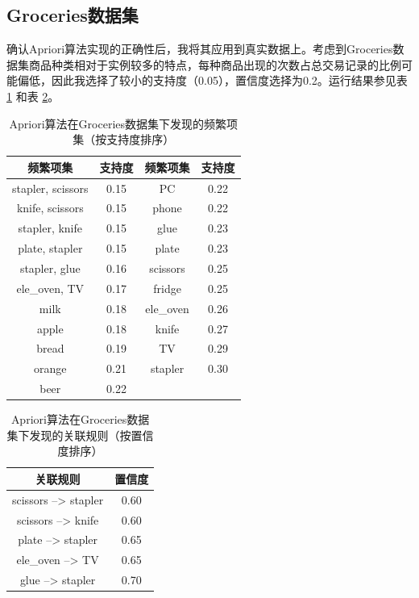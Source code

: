 \documentclass[12pt,a4paper]{article}
\theoremstyle{definition}
\begin{document}
\subsection{Groceries数据集}

确认Apriori算法实现的正确性后，我将其应用到真实数据上。考虑到Groceries数据集商品种类相对于实例较多的特点，每种商品出现的次数占总交易记录的比例可能偏低，因此我选择了较小的支持度（0.05），置信度选择为0.2。运行结果参见表 \ref{tab:apriori_gro_sup} 和表 \ref{tab:apriori_gro_con}。

\begin{table}[H]
	\renewcommand\arraystretch{1.35}
	\caption{Apriori算法在Groceries数据集下发现的频繁项集（按支持度排序）}
	\label{tab:apriori_gro_sup}
	\centering
	
	\begin{tabular}{c|c|c|c}
		\centering
		频繁项集 & 支持度 & 频繁项集 & 支持度 \\
		\hline
		stapler, scissors & 0.15 & PC & 0.22 \\
		knife, scissors & 0.15 & phone & 0.22 \\
		stapler, knife & 0.15 & glue & 0.23 \\
		plate, stapler & 0.15 &plate & 0.23 \\
		stapler, glue & 0.16 & scissors & 0.25 \\
		ele\_oven, TV & 0.17 & fridge & 0.25 \\
		milk & 0.18 & ele\_oven & 0.26 \\
		apple & 0.18 & knife & 0.27 \\
		bread & 0.19 & TV & 0.29 \\
		orange & 0.21 & stapler & 0.30 \\
		beer & 0.22 & & \\		
	\end{tabular}
\end{table}

\begin{table}[H]
	\renewcommand\arraystretch{1.35}
	\caption{Apriori算法在Groceries数据集下发现的关联规则（按置信度排序）}
	\label{tab:apriori_gro_con}
	\centering
	
	\begin{tabular}{c|c}
		\centering
		关联规则 & 置信度 \\
		\hline
		scissors --> stapler & 0.60 \\
		scissors --> knife & 0.60 \\
		plate --> stapler & 0.65 \\
		ele\_oven --> TV & 0.65 \\
		glue --> stapler & 0.70 \\
	\end{tabular}
\end{table}
\end{document}
